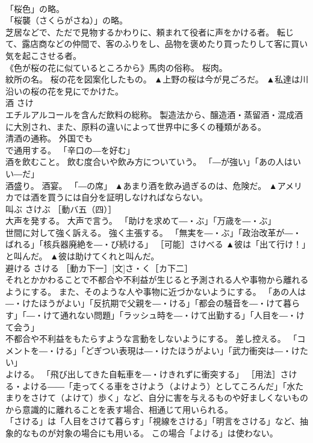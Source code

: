 \documentclass[8pt]{extreport}
\begin{document}
\begin{CJK}{UTF8}{min}
\\	「桜色」の略。 
\\	「桜襲（さくらがさね）」の略。 
\\	芝居などで、ただで見物するかわりに、頼まれて役者に声をかける者。 転じて、露店商などの仲間で、客のふりをし、品物を褒めたり買ったりして客に買い気を起こさせる者。 
\\	《色が桜の花に似ているところから》馬肉の俗称。 桜肉。 
\\	紋所の名。 桜の花を図案化したもの。	▲上野の桜は今が見ごろだ。 ▲私達は川沿いの桜の花を見にでかけた。
\\	酒	さけ	
\\	エチルアルコールを含んだ飲料の総称。 製造法から、醸造酒・蒸留酒・混成酒に大別され、また、原料の違いによって世界中に多くの種類がある。 
\\	清酒の通称。 外国でも
\\	で通用する。 「辛口の―を好む」 
\\	酒を飲むこと。 飲む度合いや飲み方についていう。 「―が強い」「あの人はいい―だ」 
\\	酒盛り。 酒宴。 「―の席」	▲あまり酒を飲み過ぎるのは、危険だ。 ▲アメリカでは酒を買うには自分を証明しなければならない。
\\	叫ぶ	さけぶ	［動バ五（四）］ 
\\	大声を発する。 大声で言う。 「助けを求めて―・ぶ」「万歳を―・ぶ」 
\\	世間に対して強く訴える。 強く主張する。 「無実を―・ぶ」「政治改革が―・ばれる」「核兵器廃絶を―・び続ける」 ［可能］さけべる	▲彼は「出て行け！」と叫んだ。 ▲彼は助けてくれと叫んだ。
\\	避ける	さける	［動カ下一］[文]さ・く［カ下二］ 
\\	それとかかわることで不都合や不利益が生じると予測される人や事物から離れるようにする。 また、そのような人や事物に近づかないようにする。 「あの人は―・けたほうがよい」「反抗期で父親を―・ける」「都会の騒音を―・けて暮らす」「―・けて通れない問題」「ラッシュ時を―・けて出勤する」「人目を―・けて会う」 
\\	不都合や不利益をもたらすような言動をしないようにする。 差し控える。 「コメントを―・ける」「どぎつい表現は―・けたほうがよい」「武力衝突は―・けたい」 
\\	よける。 「飛び出してきた自転車を―・けきれずに衝突する」 ［用法］さける・よける――「走ってくる車をさけよう（よけよう）としてころんだ」「水たまりをさけて（よけて）歩く」など、自分に害を与えるものや好ましくないものから意識的に離れることを表す場合、相通じて用いられる。 
\\	「さける」は「人目をさけて暮らす」「視線をさける」「明言をさける」など、抽象的なものが対象の場合にも用いる。 この場合「よける」は使わない。 

\end{CJK}
\end{document}
